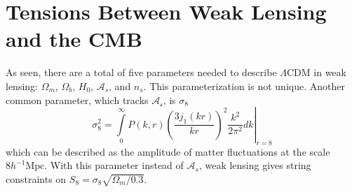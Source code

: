 \section{Tensions Between Weak Lensing and the CMB}
As seen, there are a total of five parameters needed to describe $\Lambda$CDM in weak lensing: $\Omega_m$, $\Omega_b$, $H_0$, $\mathcal{A}_s$, and $n_s$. This parameterization is not unique. Another common parameter, which tracks $\mathcal{A_s}$, is $\sigma_8$
\begin{equation}
	\sigma_8^2 = \left.\int\limits_0^\infty P(k,r)\left(\frac{3j_1(kr)}{kr}\right)^2\frac{k^2}{2\pi^2}dk\right|_{r=8}
\end{equation}
which can be described as the amplitude of matter fluctuations at the scale $8 h^{-1}\mathrm{Mpc}$. With this parameter instead of $\mathcal{A}_s$, weak lensing gives string constraints on $S_8 = \sigma_8\sqrt{\Omega_m/0.3}$. 

